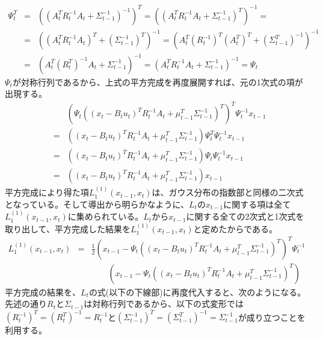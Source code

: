 \documentclass[dvipdfmx,a4paper]{jsarticle}
\begin{document}
\begin{eqnarray}
	\Psi_t^T &=& \left( \left( A_t^T R_t^{-1} A_t + \Sigma_{t - 1}^{-1} \right)^{-1} \right)^T = \left( \left( A_t^T R_t^{-1} A_t + \Sigma_{t - 1}^{-1} \right)^T \right)^{-1} = \nonumber \\
	&=& \left( \left( A_t^T R_t^{-1} A_t \right)^T + \left( \Sigma_{t - 1}^{-1} \right)^T \right)^{-1} = \left( A_t^T \left( R_t^{-1} \right)^T \left( A_t^T \right)^T + \left( \Sigma_{t - 1}^T \right)^{-1} \right)^{-1} \nonumber \\
	&=& \left( A_t^T \left( R_t^T \right)^{-1} A_t + \Sigma_{t - 1}^{-1} \right)^{-1} = \left( A_t^T R_t^{-1} A_t + \Sigma_{t - 1}^{-1} \right)^{-1} = \Psi_t
\end{eqnarray}
$\Psi_t$が対称行列であるから、上式の平方完成を再度展開すれば、元の1次式の項が出現する。
\begin{eqnarray}
	&& \left( \Psi_t \left( \left( x_t - B_t u_t \right)^T R_t^{-1} A_t + \mu_{t - 1}^T \Sigma_{t - 1}^{-1} \right)^T \right)^T \Psi_t^{-1} x_{t - 1} \nonumber \\
	&=& \left( \left( x_t - B_t u_t \right)^T R_t^{-1} A_t + \mu_{t - 1}^T \Sigma_{t - 1}^{-1} \right) \Psi_t^T \Psi_t^{-1} x_{t - 1} \nonumber \\
	&=& \left( \left( x_t - B_t u_t \right)^T R_t^{-1} A_t + \mu_{t - 1}^T \Sigma_{t - 1}^{-1} \right) \Psi_t \Psi_t^{-1} x_{t - 1} \nonumber \\
	&=& \left( \left( x_t - B_t u_t \right)^T R_t^{-1} A_t + \mu_{t - 1}^T \Sigma_{t - 1}^{-1} \right) x_{t - 1}
\end{eqnarray}
平方完成により得た項$L_1^{(1)}(x_{t - 1}, x_t)$は、ガウス分布の指数部と同様の二次式となっている。そして導出から明らかなように、$L_t$の$x_{t - 1}$に関する項は全て$L_1^{(1)}(x_{t - 1}, x_t)$に集められている。$L_t$から$x_{t - 1}$に関する全ての2次式と1次式を取り出して、平方完成した結果を$L_1^{(1)}(x_{t - 1}, x_t)$と定めたからである。
\begin{eqnarray}
	L_1^{(1)}(x_{t - 1}, x_t) &=& \frac{1}{2} \left( x_{t - 1} - \Psi_t \left( \left( x_t - B_t u_t \right)^T R_t^{-1} A_t + \mu_{t - 1}^T \Sigma_{t - 1}^{-1} \right)^T \right)^T \Psi_t^{-1} \nonumber \\
	&& \qquad \left( x_{t - 1} - \Psi_t \left( \left( x_t - B_t u_t \right)^T R_t^{-1} A_t + \mu_{t - 1}^T \Sigma_{t - 1}^{-1} \right)^T \right)
\end{eqnarray}
平方完成の結果を、$L_t$の式(以下の下線部)に再度代入すると、次のようになる。先述の通り$R_t$と$\Sigma_{t - 1}$は対称行列であるから、以下の式変形では$\left( R_t^{-1} \right)^T = \left( R_t^T \right)^{-1} = R_t^{-1}$と$\left( \Sigma_{t - 1}^{-1} \right)^T = \left( \Sigma_{t - 1}^T \right)^{-1} = \Sigma_{t - 1}^{-1}$が成り立つことを利用する。
\end{document}
